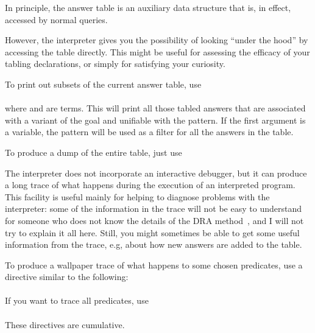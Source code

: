 %

In principle, the answer table is an auxiliary data structure that is, in
effect, accessed by normal queries.

However, the interpreter gives you the possibility of looking ``under the
hood'' by accessing the table directly.  This might be useful for assessing
the efficacy of your tabling declarations, or simply for satisfying your
curiosity.

To print out subsets of the current answer table, use\\
\ind{}%
\label{dir:answers}\\
where  and  are terms.
This will print all those tabled answers that are associated with a variant
of the goal and unifiable with the pattern.  If the first argument is a
variable, the pattern will be used as a filter for all the answers in the
table.

To produce a dump of the entire table, just use\\
\ind{}




The interpreter does not incorporate an interactive debugger, but it can
produce a long trace of what happens during the execution of an interpreted
program.  This facility is useful mainly for helping to diagnose problems
with the interpreter: some of the information in the trace will not be easy
to understand for someone who does not know the details of the DRA
method~\cite{guo-gupta-dra}, and I will not try to explain it all here.
Still, you might sometimes be able to get some useful information from the
trace, e.g, about how new answers are added to the table.

To produce a wallpaper trace of what happens to some chosen predicates, use a
directive similar to the following:\\
\ind{}\label{dir:trace}\\
If you want to trace all predicates, use\\
\ind{}\\
These directives are cumulative.


